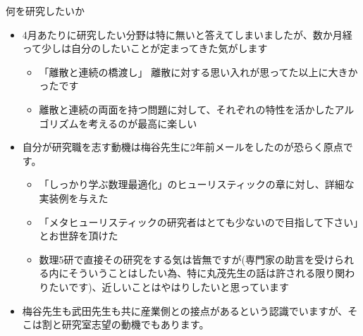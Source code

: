 \documentclass[13pt,aspectratio=169,table,dvipdfmx]{beamer}
\newif\ifShowHidden
\begin{document}

\ifShowHidden
    \begin{frame}{\LARGE{Summary}}
        \begin{block}{Future Work}
            \begin{itemize}
                \item More numerical experiments
                \item Theoretical analysis
            \end{itemize}
        \end{block}
    \end{frame}
\fi

\ifShowHidden
    \begin{frame}{\LARGE{何を研究したいか}}
        \begin{itemize}
            \item 4月あたりに研究したい分野は特に無いと答えてしまいましたが、数か月経って少しは自分のしたいことが定まってきた気がします
                  \begin{itemize}
                      \item 「離散と連続の橋渡し」 離散に対する思い入れが思ってた以上に大きかったです
                      \item 離散と連続の両面を持つ問題に対して、それぞれの特性を活かしたアルゴリズムを考えるのが最高に楽しい
                  \end{itemize}
            \item 自分が研究職を志す動機は梅谷先生に2年前メールをしたのが恐らく原点です。
                  \begin{itemize}
                      \item 「しっかり学ぶ数理最適化」のヒューリスティックの章に対し、詳細な実装例を与えた
                      \item 「メタヒューリスティックの研究者はとても少ないので目指して下さい」とお世辞を頂けた
                      \item 数理5研で直接その研究をする気は皆無ですが(専門家の助言を受けられる内にそういうことはしたい為、特に丸茂先生の話は許される限り関わりたいです)、近しいことはやはりしたいと思っています
                  \end{itemize}
            \item 梅谷先生も武田先生も共に産業側との接点があるという認識でいますが、そこは割と研究室志望の動機でもあります。
                  \begin{itemize}

\end{itemize}
\end{itemize}
\end{frame}
\end{document}

